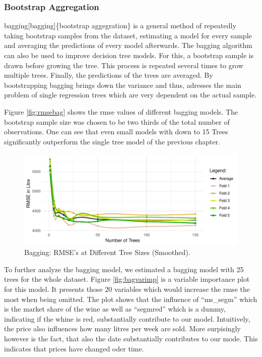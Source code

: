 \documentclass[11pt,]{article}
\begin{document}
\hypertarget{bootstrap-aggregation}{%
\subsubsection{Bootstrap Aggregation}\label{bootstrap-aggregation}}

\ac{bagging}{[}bagging{]}\{bootstrap aggegration\} is a general method
of repeatedly taking bootstrap samples from the dataset, estimating a
model for every sample and averaging the predictions of every model
afterwards. The \ac{bagging} algorithm can also be used to improve
decision tree models. For this, a bootstrap sample is drawn before
growing the tree. This process is repeated several times to grow
multiple trees. Finally, the predictions of the trees are averaged. By
bootstrapping \ac{bagging} brings down the variance and thus, adresses
the main problem of single regression trees which are very dependent on
the actual sample.

Figure \ref{fig:rmsebag} shows the \ac{rmse} values of different
\ac{bagging} models. The bootstrap sample size was chosen to be two
thirds of the total number of observations. One can see that even small
models with down to 15 Trees significantly outperform the single tree
model of the previous chapter.

\begin{figure}

\includegraphics{../00_data/output_paper/14_bagging} \hfill{}

\caption[Bagging: RMSE's at Different Tree Sizes]{\label{fig:rmsebag}Bagging: RMSE's at Different Tree Sizes (Smoothed).}\label{fig:bag}
\end{figure}

To further analyze the \ac{bagging} model, we estimated a \ac{bagging}
model with 25 trees for the whole dataset. Figure \ref{fig:bagvarimp} is
a variable importance plot for this model. It presents those 20
variables which would increase the \ac{rmse} the most when being
omitted. The plot shows that the influence of \enquote{ms\_segm} which
is the market share of the wine as well as \enquote{segmred} which is a
dummy, indicating if the whine is red, substantially contribute to our
model. Intuitively, the price also influences how many litres per week
are sold. More surpisingly however is the fact, that also the date
substantially contributes to our mode. This indicates that prices have
changed oder time.
\end{document}
